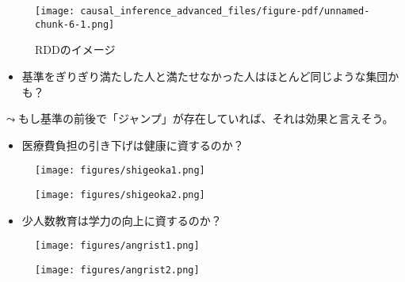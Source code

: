 \documentclass[
  xelatex,
  ja=standard]{bxjsarticle}
\providecommand{\tightlist}{%
  \setlength{\itemsep}{0pt}\setlength{\parskip}{0pt}}\usepackage{longtable,booktabs,array}
\begin{document}
\begin{figure}[htpb]

{\centering \texttt{[image: causal\_inference\_advanced\_files/figure-pdf/unnamed-chunk-6-1.png]}

}

\caption{RDDのイメージ}

\end{figure}

\begin{itemize}
\tightlist
\item
  基準をぎりぎり満たした人と満たせなかった人はほとんど同じような集団かも？
\end{itemize}

\(\leadsto\)もし基準の前後で「ジャンプ」が存在していれば、それは効果と言えそう。

\begin{itemize}
\tightlist
\item
  医療費負担の引き下げは健康に資するのか？
\end{itemize}

\begin{figure}[htpb]

{\centering \texttt{[image: figures/shigeoka1.png]}

}

\caption{\citet{shigeoka2014}}

\end{figure}

\begin{figure}[htpb]

{\centering \texttt{[image: figures/shigeoka2.png]}

}

\caption{\citet{shigeoka2014}}

\end{figure}

\begin{itemize}
\tightlist
\item
  少人数教育は学力の向上に資するのか？
\end{itemize}

\begin{figure}[htpb]

{\centering \texttt{[image: figures/angrist1.png]}

}

\caption{\citet{angrist1999}}

\end{figure}

\begin{figure}[htpb]

{\centering \texttt{[image: figures/angrist2.png]}

}

\caption{\citet{angrist1999}}

\end{figure}
\end{document}
